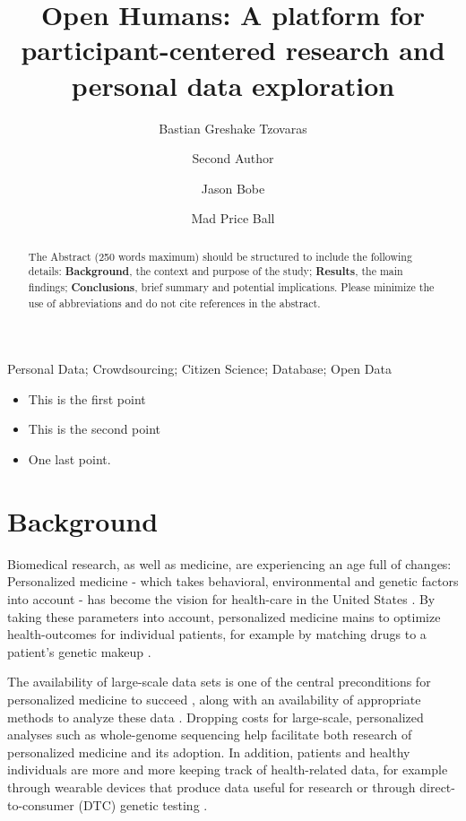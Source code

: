 \documentclass[a4paper,num-refs]{oup-contemporary}
\title{Open Humans: A platform for participant-centered research and personal data exploration}
\author[1, 2,\authfn{1}]{Bastian Greshake Tzovaras}
\author[4]{Second Author}
\author[3]{Jason Bobe}
\author[1,\authfn{1}]{Mad Price Ball}
\affil[1]{Open Humans Foundation, USA}
\affil[2]{Lawrence Berkeley National Laboratory, Berkeley, CA, USA}
\affil[3]{Mount Sinai School of Medicine, NY, USA}
\affil[4]{Second Author Affiliation}
\begin{document}
\begin{frontmatter}
\maketitle
\begin{abstract}
The Abstract (250 words maximum) should be structured to include the following details: \textbf{Background}, the context and purpose of the study; \textbf{Results}, the main findings; \textbf{Conclusions}, brief summary and potential implications. Please minimize the use of abbreviations and do not cite references in the abstract.
\end{abstract}

\begin{keywords}
Personal Data; Crowdsourcing; Citizen Science; Database; Open Data 
\end{keywords}
\end{frontmatter}

\begin{keypoints*}
\begin{itemize}
\item This is the first point
\item This is the second point
\item One last point.
\end{itemize}
\end{keypoints*}


\section{Background}
\label{sec:background}
Biomedical research, as well as medicine, are experiencing an age full of changes: Personalized medicine - which takes behavioral, environmental and genetic factors into account - has become the vision for health-care in the United States \cite{Collins2015}. By taking these parameters into account, personalized medicine mains to optimize health-outcomes for individual patients, for example by matching drugs to a patient's genetic makeup \cite{Chhibber2014, Kummar2015}.

The availability of large-scale data sets is one of the central preconditions for personalized medicine to succeed \cite{Kohane2015}, along with an availability of appropriate methods to analyze these data \cite{Dilsizian2013, Moon2007}. Dropping costs for large-scale, personalized analyses such as whole-genome sequencing \cite{wetterstrand} help facilitate both research of personalized medicine and its adoption. In addition, patients and healthy individuals are more and more keeping track of health-related data, for example through wearable devices \cite{Swan2009} that produce data useful for research \cite{Gay2015} or through direct-to-consumer (DTC) genetic testing \cite{Corpas2015}.
\end{document}

